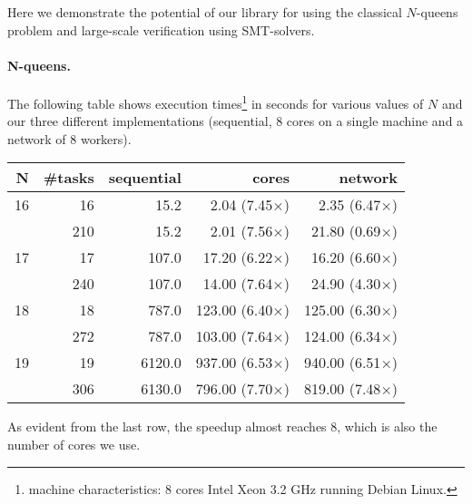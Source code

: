 \documentclass[preprint]{sigplanconf}
\begin{document}
Here we demonstrate the potential of our library for using the
classical $N$-queens problem and large-scale verification using SMT-solvers.

\paragraph{N-queens.} 
The following table shows execution times\footnote{machine
  characteristics: 8 cores Intel Xeon 3.2 GHz running Debian Linux.} 
in seconds for various values of $N$
and our three different implementations (sequential, 8 cores on a
single machine and a network of 8 workers).
\begin{center}
  \begin{tabular}{|r|r|r|r|r|}
    \hline
    N & \#tasks  & sequential& cores                 & network 
    \\\hline\hline
    16 &   16    &  15.2     &   2.04 (7.45$\times$) &  2.35  (6.47$\times$) 
    \\\hline
       &  210    &  15.2     &   2.01 (7.56$\times$) & 21.80  (0.69$\times$)
    \\\hline
    17 &   17    & 107.0     &  17.20 (6.22$\times$) & 16.20  (6.60$\times$)
    \\\hline
       &  240    & 107.0     &  14.00 (7.64$\times$) & 24.90  (4.30$\times$)
    \\\hline
    18 &   18    & 787.0     & 123.00 (6.40$\times$) & 125.00 (6.30$\times$)  
    \\\hline
       &  272    & 787.0     & 103.00 (7.64$\times$) & 124.00 (6.34$\times$)  
    \\\hline
    19 &   19    &6120.0     & 937.00 (6.53$\times$) & 940.00 (6.51$\times$)  
    \\\hline
       &  306    &6130.0     & 796.00 (7.70$\times$) & 819.00 (7.48$\times$)
    \\\hline
  \end{tabular}
\end{center}
As evident from the last row, the speedup almost reaches 8, which is
also the number of cores we use.

\end{document}
